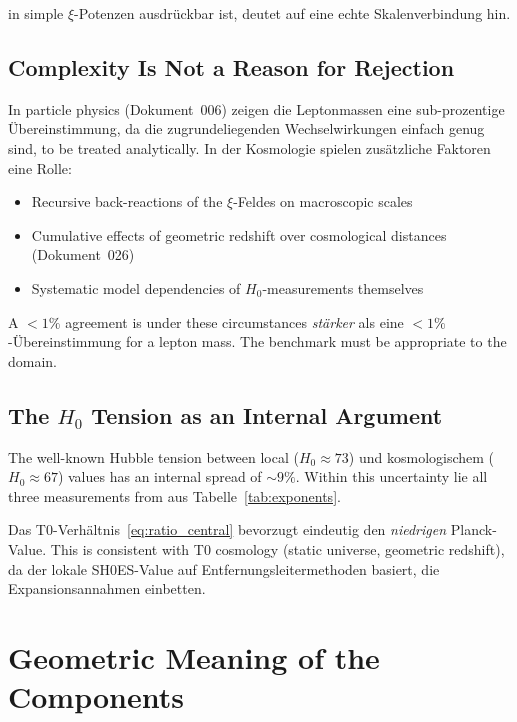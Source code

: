 in simple $\xi$-Potenzen ausdrückbar ist, deutet auf eine echte
Skalenverbindung hin.

\subsection{Complexity Is Not a Reason for Rejection}

In particle physics (Dokument~006) zeigen die Leptonmassen eine
sub-prozentige Übereinstimmung, da die zugrundeliegenden Wechselwirkungen
einfach genug sind, to be treated analytically. In der Kosmologie
spielen zusätzliche Faktoren eine Rolle:

\begin{itemize}
    \item Recursive back-reactions of the $\xi$-Feldes on macroscopic scales
    \item Cumulative effects of geometric redshift over
          cosmological distances (Dokument~026)
    \item Systematic model dependencies of $H_0$-measurements themselves
\end{itemize}

A $<1\%$ agreement is under these circumstances
\emph{stärker} als eine $<1\%$-Übereinstimmung for a lepton mass.
The benchmark must be appropriate to the domain.

\subsection{The \texorpdfstring{$H_0$}{H0} Tension as an Internal Argument}

The well-known Hubble tension between local ($H_0 \approx 73$) und
kosmologischem ($H_0 \approx 67$) values has an internal spread of $\sim
9\%$. Within this uncertainty lie all three measurements from aus
Tabelle~\ref{tab:exponents}.

Das T0-Verhältnis~\eqref{eq:ratio_central} bevorzugt eindeutig den
\emph{niedrigen} Planck-Value. This is consistent with T0 cosmology
(static universe, geometric redshift), da der lokale
SH0ES-Value auf Entfernungsleitermethoden basiert, die Expansionsannahmen
einbetten.

\section{Geometric Meaning of the Components}
\label{sec:geometry}


